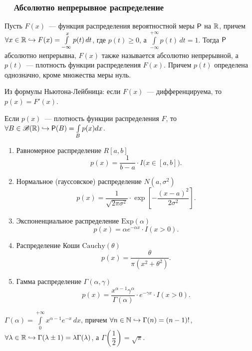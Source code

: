 \subsubsection*{~~Абсолютно непрерывное распределение}
\begin{definition}
	Пусть $F(x)$~--- функция распределения вероятностной меры $\P$ на $\R$, причем $\forall x \in \R \hookrightarrow F(x) = \int\limits_{-\infty}^{x} p(t) \, d t$, где  $p(t) \geqslant 0$, а $\int\limits_{-\infty}^{+\infty} p(t) \, d t = 1$. 
	Тогда $\P$ абсолютно непрерывна, $F(x)$ также называется абсолютно непрерывной, а $p(t)$~--- плотность функции распределения $F(x)$. Причем $p(t)$ определена однозначно, кроме множества меры нуль.
	
	Из формулы Ньютона-Лейбница: если $F(x)$~--- дифференцируема, то $p(x) = F'(x)$.
	
	Если $p(x)$~--- плотность функции распределения $F$, то $\forall B \in \B(\R) \hookrightarrow \P(B) = \int\limits_{B} p(x)dx$.
\end{definition}

\begin{enumerate}
	\item{Равномерное распределение $R[a,b]$ 
		$$p(x) = \frac{1}{b -a } \cdot I \big( x \in [a,b] \big). $$
	}
		
	\item{Нормальное (гауссовское) распределение $N(a, \sigma^2)$
		$$p(x) = \frac{1}{\sqrt{2 \pi \sigma^2}} \cdot \exp \left[ -\frac{(x - a)^2}{2 \sigma^2} \right]. $$
	}
		
	\item{Экспоненциальное распределение $\text{Exp}(\alpha)$
	    $$p(x) = \alpha e^{-\alpha x} \cdot I(x > 0).$$
	}
	
	\item{Распределение Коши $\text{Cauchy}(\theta)$
		$$p(x) = \frac{\theta}{\pi \left(x^2 + \theta^2 \right)}.$$
	}
		
	\item{Гамма распределение $\Gamma(\alpha, \gamma)$
		$$p(x) = \frac{x^{\alpha - 1} \gamma^{\alpha}}{\Gamma(\alpha)} \cdot e^{-\gamma x} \cdot I(x > 0).$$
	}
\end{enumerate}

\begin{definition}
	$\Gamma(\alpha) = \int\limits_0^{+\infty} x^{\alpha - 1} e^{-x} \, d x$, причем $\forall n \in \N \hookrightarrow \Gamma(n) = (n - 1)!$, $\forall \lambda \in \R \hookrightarrow \Gamma(\lambda \pm 1) = \lambda \Gamma(\lambda)$, а $\Gamma\left(\dfrac{1}{2}\right) = \sqrt{\pi}$.
\end{definition}

